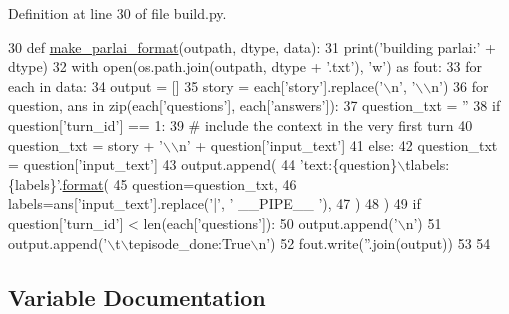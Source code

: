 Definition at line 30 of file build.\+py.


\begin{DoxyCode}
30 \textcolor{keyword}{def }\hyperlink{namespaceparlai_1_1tasks_1_1quac_1_1build_a08c212462b5c58cde91192d35f24f0cc}{make\_parlai\_format}(outpath, dtype, data):
31     print(\textcolor{stringliteral}{'building parlai:'} + dtype)
32     with open(os.path.join(outpath, dtype + \textcolor{stringliteral}{'.txt'}), \textcolor{stringliteral}{'w'}) \textcolor{keyword}{as} fout:
33         \textcolor{keywordflow}{for} each \textcolor{keywordflow}{in} data:
34             output = []
35             story = each[\textcolor{stringliteral}{'story'}].replace(\textcolor{stringliteral}{'\(\backslash\)n'}, \textcolor{stringliteral}{'\(\backslash\)\(\backslash\)n'})
36             \textcolor{keywordflow}{for} question, ans \textcolor{keywordflow}{in} zip(each[\textcolor{stringliteral}{'questions'}], each[\textcolor{stringliteral}{'answers'}]):
37                 question\_txt = \textcolor{stringliteral}{''}
38                 \textcolor{keywordflow}{if} question[\textcolor{stringliteral}{'turn\_id'}] == 1:
39                     \textcolor{comment}{# include the context in the very first turn}
40                     question\_txt = story + \textcolor{stringliteral}{'\(\backslash\)\(\backslash\)n'} + question[\textcolor{stringliteral}{'input\_text'}]
41                 \textcolor{keywordflow}{else}:
42                     question\_txt = question[\textcolor{stringliteral}{'input\_text'}]
43                 output.append(
44                     \textcolor{stringliteral}{'text:\{question\}\(\backslash\)tlabels:\{labels\}'}.\hyperlink{namespaceparlai_1_1chat__service_1_1services_1_1messenger_1_1shared__utils_a32e2e2022b824fbaf80c747160b52a76}{format}(
45                         question=question\_txt,
46                         labels=ans[\textcolor{stringliteral}{'input\_text'}].replace(\textcolor{stringliteral}{'|'}, \textcolor{stringliteral}{' \_\_PIPE\_\_ '}),
47                     )
48                 )
49                 \textcolor{keywordflow}{if} question[\textcolor{stringliteral}{'turn\_id'}] < len(each[\textcolor{stringliteral}{'questions'}]):
50                     output.append(\textcolor{stringliteral}{'\(\backslash\)n'})
51             output.append(\textcolor{stringliteral}{'\(\backslash\)t\(\backslash\)tepisode\_done:True\(\backslash\)n'})
52             fout.write(\textcolor{stringliteral}{''}.join(output))
53 
54 
\end{DoxyCode}


\subsection{Variable Documentation}
\mbox{\label{namespaceparlai_1_1tasks_1_1coqa_1_1build_a4c14e148e955a0ccc3be41de469e7cc1}} 
